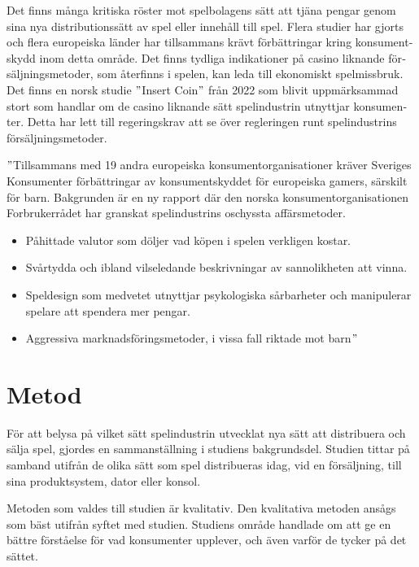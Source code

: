 \documentclass[11p]{article}
\begin{document}
\begin{otherlanguage}{swedish}
    Det finns många kritiska röster mot spelbolagens sätt att tjäna pengar genom sina nya distributionssätt av spel eller innehåll till spel.
    Flera studier har gjorts och flera europeiska länder har tillsammans krävt förbättringar kring konsumentskydd inom detta område.
    Det finns tydliga indikationer på casino liknande försäljningsmetoder, som återfinns i spelen, kan leda till ekonomiskt spelmissbruk.
    Det finns en norsk studie \("\)Insert Coin\("\) från 2022 som blivit uppmärksammad stort som handlar om de casino liknande sätt spelindustrin utnyttjar konsumenter.
    Detta har lett till regeringskrav att se över regleringen runt spelindustrins försäljningsmetoder.

    \setlength{\leftskip}{1cm}

    \("\)Tillsammans med 19 andra europeiska konsumentorganisationer kräver Sveriges Konsumenter förbättringar av konsumentskyddet för europeiska gamers, särskilt för barn.
    Bakgrunden är en ny rapport där den norska konsumentorganisationen Forbrukerrådet har granskat spelindustrins oschyssta affärsmetoder.
    \begin{itemize}
        \item Påhittade valutor som döljer vad köpen i spelen verkligen kostar.
        \item Svårtydda och ibland vilseledande beskrivningar av sannolikheten att vinna.
        \item Speldesign som medvetet utnyttjar psykologiska sårbarheter och manipulerar spelare att spendera mer pengar.
        \item Aggressiva marknadsföringsmetoder, i vissa fall riktade mot barn\("\)\parencite{insertcoin}
    \end{itemize}
    \setlength{\leftskip}{0cm}

        \section{Metod}

    För att belysa på vilket sätt spelindustrin utvecklat nya sätt att distribuera och sälja spel, gjordes en sammanställning i studiens bakgrundsdel. Studien tittar på samband utifrån de olika sätt som spel distribueras idag, vid en försäljning, till sina produktsystem, dator eller konsol.

    Metoden som valdes till studien är kvalitativ. Den kvalitativa metoden ansågs som bäst utifrån syftet med studien. Studiens område handlade om att ge en bättre förståelse för vad konsumenter upplever,  och även varför de tycker på det sättet.


\end{otherlanguage}
\end{document}
